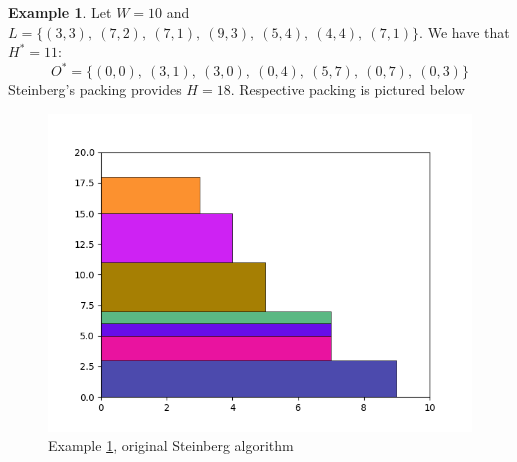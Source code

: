 \documentclass{article}
\theoremstyle{definition}
\newtheorem{example}{Example}
\theoremstyle{theorem}
\numberwithin{proposition}{section}
\begin{document}
    \begin{example}\label{ex6}
        Let $W = 10$ and $L = \{(3,3),~(7,2),~(7,1),~(9,3),~(5,4),~(4,4),~(7,1)\}$. We have that $H^{*} = 11$:
        \begin{equation*}
            O^{*}=\{(0,0),~(3,1),~(3,0),~(0,4),~(5,7),~(0,7),~(0,3)\}
        \end{equation*} 
        Steinberg’s packing provides $H = 18$. Respective packing is pictured below
        \begin{figure}[H]
            \centering
            \includegraphics[scale=0.5]{../examples/original-6.png}
            \caption{Example \ref{ex6}, original Steinberg algorithm}
        \end{figure} 
    \end{example}
\end{document}
